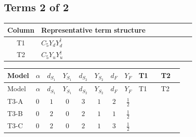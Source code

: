 \documentclass[8pt]{article}
\begin{document}
\begin{landscape}
\subsection*{Terms 2 of 2}
\begin{center}
\begin{tabular}{@{}c >{\raggedright\arraybackslash}p{0.82\linewidth}@{}}
\toprule
Column & Representative term structure \\
\midrule
T1 & \(\displaystyle C_{5} Y_d Y_d^\dagger\) \\
\midrule
T2 & \(\displaystyle C_{5} Y_u Y_u^\dagger\) \\
\midrule
\bottomrule
\end{tabular}
\end{center}
\smallskip
\tiny
\begin{longtable}{@{}llcccccc >{\raggedright\arraybackslash}p{0.21\linewidth} >{\raggedright\arraybackslash}p{0.21\linewidth}@{}}
\toprule
Model & $\alpha$ & $d_{S_1}$ & $Y_{S_1}$ & $d_{S_2}$ & $Y_{S_2}$ & $d_F$ & $Y_F$ & T1 & T2 \\
\midrule
\endfirsthead
\toprule
Model & $\alpha$ & $d_{S_1}$ & $Y_{S_1}$ & $d_{S_2}$ & $Y_{S_2}$ & $d_F$ & $Y_F$ & T1 & T2 \\
\midrule
\endhead
T3-A & $0$ & $1$ & $0$ & $3$ & $1$ & $2$ & $\frac{1}{2}$ & \scriptsize\adjustbox{max width=\linewidth}{$\begin{gathered} 6 C_{5} Y_d Y_d^\dagger\end{gathered}$} & \scriptsize\adjustbox{max width=\linewidth}{$\begin{gathered} 6 C_{5} Y_u Y_u^\dagger\end{gathered}$} \\
\midrule
T3-B & $0$ & $2$ & $0$ & $2$ & $1$ & $1$ & $\frac{1}{2}$ & \scriptsize\adjustbox{max width=\linewidth}{$\begin{gathered} 6 C_{5} Y_d Y_d^\dagger\end{gathered}$} & \scriptsize\adjustbox{max width=\linewidth}{$\begin{gathered} 6 C_{5} Y_u Y_u^\dagger\end{gathered}$} \\
\midrule
T3-C & $0$ & $2$ & $0$ & $2$ & $1$ & $3$ & $\frac{1}{2}$ & \scriptsize\adjustbox{max width=\linewidth}{$\begin{gathered} 6 C_{5} Y_d Y_d^\dagger\end{gathered}$} & \scriptsize\adjustbox{max width=\linewidth}{$\begin{gathered} 6 C_{5} Y_u Y_u^\dagger\end{gathered}$} \\

\end{longtable}
\end{landscape}
\end{document}
